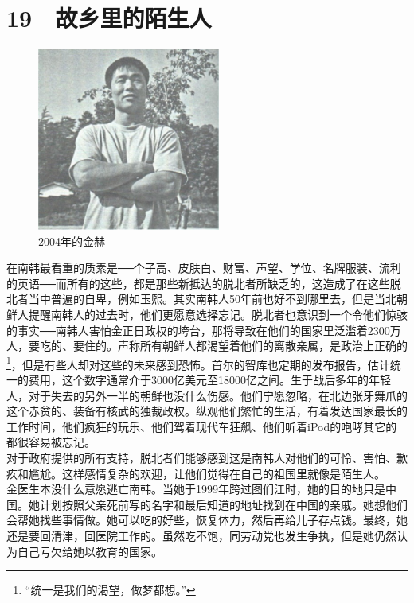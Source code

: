 \fancyhead[RO]{\thepage}
\fancyhead[LE]{\thepage}
\fancyfoot[LE,RO]{}
\fancyfoot[LO,CE]{}
\fancyfoot[CO,RE]{}
\chapter*{19 {\FA } 故乡里的陌生人}
\begin{figure}[!htbp]
\centering
\includegraphics[width=6cm]{./Chapters/Images/19.jpg}
\caption*{2004年的金赫}
\end{figure}


在南韩最看重的质素是──个子高、皮肤白、财富、声望、学位、名牌服装、流利的英语──而所有的这些，都是那些新抵达的脱北者所缺乏的，这造成了在这些脱北者当中普遍的自卑，例如玉熙。其实南韩人50年前也好不到哪里去，但是当北朝鲜人提醒南韩人的过去时，他们更愿意选择忘记。脱北者也意识到一个令他们惊骇的事实──南韩人害怕金正日政权的垮台，那将导致在他们的国家里泛滥着2300万人，要吃的、要住的。声称所有朝鲜人都渴望着他们的离散亲属，是政治上正确的\footnote{“统一是我们的渴望，做梦都想。”}，但是有些人却对这些的未来感到恐怖。首尔的智库也定期的发布报告，估计统一的费用，这个数字通常介于3000亿美元至18000亿之间。生于战后多年的年轻人，对于失去的另外一半的朝鲜也没什么伤感。他们宁愿忽略，在北边张牙舞爪的这个赤贫的、装备有核武的独裁政权。纵观他们繁忙的生活，有着发达国家最长的工作时间，他们疯狂的玩乐、他们驾着现代车狂飙、他们听着iPod的咆哮其它的都很容易被忘记。\\

对于政府提供的所有支持，脱北者们能够感到这是南韩人对他们的可怜、害怕、歉疚和尴尬。这样感情复杂的欢迎，让他们觉得在自己的祖国里就像是陌生人。\\

金医生本没什么意愿逃亡南韩。当她于1999年跨过图们江时，她的目的地只是中国。她计划按照父亲死前写的名字和最后知道的地址找到在中国的亲戚。她想他们会帮她找些事情做。她可以吃的好些，恢复体力，然后再给儿子存点钱。最终，她还是要回清津，回医院工作的。虽然吃不饱，同劳动党也发生争执，但是她仍然认为自己亏欠给她以教育的国家。\\

